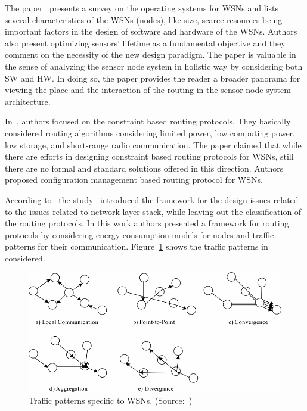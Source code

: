\documentclass[12pt, oneandhalf, chaparabic, sees, ms]{metu}
\begin{document}
\newpage


The paper~\cite{farooq2011} presents a survey on the operating systems for WSNs and lists several characteristics of the WSNs (nodes), 
like size, scarce resources being important factors in the design of software and hardware of the WSNs. 
Authors also present optimizing sensors' lifetime as a fundamental objective and they comment on the necessity of the new design paradigm. 
The paper is valuable in the sense of analyzing the sensor node system in holistic way by considering both SW and HW.
In doing so, the paper provides the reader a broader panorama for viewing the place and the interaction of the routing in the sensor node system architecture.

In~\cite{ndie2012}, authors focused on the constraint based routing protocols. They basically considered routing algorithms
considering limited power, low computing power, low storage,  and short-range radio communication. The paper claimed that while there are efforts
in designing constraint based routing protocols for WSNs, still there are no formal and standard solutions offered in this direction. Authors
proposed configuration management based routing protocol for WSNs.


According to~\cite{pantazis2013} the study~\cite{akyildiz2002-2} introduced the framework for the design issues related to the issues related to network layer stack,
while leaving out the classification of the routing protocols. In this work authors presented a framework for routing protocols by considering energy consumption models for nodes
and traffic patterns for their communication. Figure~\ref{fig:traffic} shows the traffic patterns in~\cite{pantazis2013} considered.
% 
%
%
\begin{figure}[!htbp]
 \begin{center}
  \includegraphics[width=\textwidth]{traffic.png}
 \end{center}
 \caption{Traffic patterns specific to WSNs. (Source:~\protect\cite{pantazis2013})}
  \label{fig:traffic}
\end{figure}
% 
%
%
\end{document}
